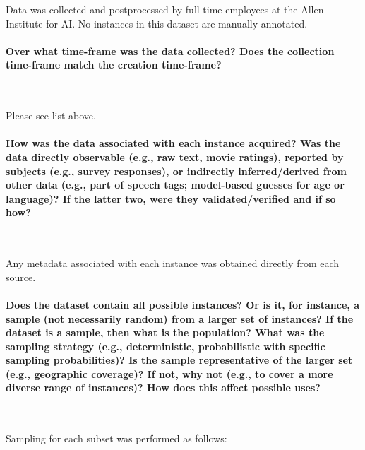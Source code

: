 \documentclass{article}
\begin{document}
Data was collected and postprocessed by full-time employees at the Allen Institute for AI. No instances in this dataset are manually annotated.

\paragraph{Over what time-frame was the data collected? Does the collection time-frame match the creation time-frame?}~

Please see list above. 

\paragraph{How was the data associated with each instance acquired? Was the data directly observable (e.g., raw text, movie ratings), reported by subjects (e.g., survey responses), or indirectly inferred/derived from other data (e.g., part of speech tags; model-based guesses for age or language)? If the latter two, were they validated/verified and if so how?}~

Any metadata associated with each instance was obtained directly from each source. 

\paragraph{Does the dataset contain all possible instances? Or is it, for instance, a sample (not necessarily random) from a larger set of instances? 
If the dataset is a sample, then what is the population? What was the sampling strategy (e.g., deterministic, probabilistic with specific sampling probabilities)? Is the sample representative of the larger set (e.g., geographic coverage)? If not, why not (e.g., to cover a more diverse range of instances)? How does this affect possible uses?}~

Sampling for each subset was performed as follows:
\end{document}
